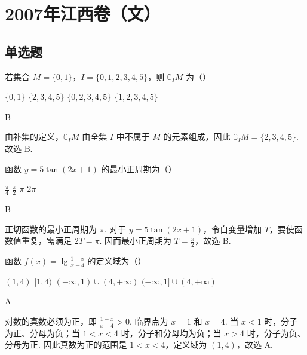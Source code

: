 
\chapter{2007年江西卷（文）}

\section{单选题}

\begin{problem}
若集合 \(M = \{0, 1\}\)，\(I = \{0, 1, 2, 3, 4, 5\}\)，则 \(\complement_I M\) 为（\quad）

\choices
    {\(\{0, 1\}\)}
    {\(\{2, 3, 4, 5\}\)}
    {\(\{0, 2, 3, 4, 5\}\)}
    {\(\{1, 2, 3, 4, 5\}\)}

\begin{answer}
B
\end{answer}

\begin{solution}
由补集的定义，\(\complement_I M\) 由全集 \(I\) 中不属于 \(M\) 的元素组成，因此
\(\complement_I M=\{2,3,4,5\}\). 故选 B.
\end{solution}
\end{problem}

\begin{problem}
函数 \( y = 5\tan (2x + 1) \) 的最小正周期为（\quad）

\choices
    {\(\frac{\pi}{4}\)}
    {\(\frac{\pi}{2}\)}
    {\(\pi\)}
    {\(2\pi\)}

\begin{answer}
B
\end{answer}

\begin{solution}
正切函数的最小正周期为 \(\pi\). 对于 \(y=5\tan(2x+1)\)，令自变量增加 \(T\)，要使函数值重复，需满足 \(2T=\pi\). 因而最小正周期为 \(T=\frac{\pi}{2}\)，故选 B.
\end{solution}
\end{problem}

\begin{problem}
函数 \( f(x) = \lg \frac{1-x}{x-4} \) 的定义域为（\quad）

\choices
    {\((1, 4)\)}
    {\([1,4)\)}
    {\((-\infty, 1) \cup (4, +\infty)\)}
    {\((-\infty, 1] \cup (4, +\infty)\)}

\begin{answer}
A
\end{answer}

\begin{solution}
对数的真数必须为正，即
\(\frac{1-x}{x-4}>0\). 临界点为 \(x=1\) 和 \(x=4\). 当 \(x<1\) 时，分子为正、分母为负；当 \(1<x<4\) 时，分子和分母均为负；当 \(x>4\) 时，分子为负、分母为正. 因此真数为正的范围是 \(1<x<4\)，定义域为 \((1,4)\)，故选 A.
\end{solution}
\end{problem}

